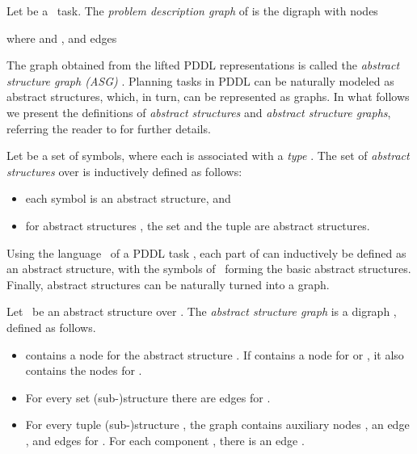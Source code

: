 \documentclass{article}
\begin{document}
\begin{definition}
    Let  be a \sasp\ task.
    The \emph{problem description graph} of  is the digraph
     with nodes
    
    where  and ,
    and edges
    
    
  \end{definition}
  
The graph obtained from the lifted PDDL representations is called the
\emph{abstract structure graph (ASG)} \cite{sievers-et-al-icaps2019}. Planning
tasks in PDDL can be naturally modeled as abstract structures, which, in turn,
can be represented as graphs. In what follows we present the definitions of
\emph{abstract structures} and \emph{abstract structure graphs}, referring the
reader to \citet{sievers-et-al-icaps2019} for further details.

\begin{definition}
  Let  be a set of symbols, where each  is associated with a
  \emph{type} . The set of \emph{abstract structures} over  is
  inductively defined as follows:
\begin{itemize}
    \item each symbol  is an abstract structure, and

    \item for abstract structures , the set  and the tuple 
    are abstract structures.
  \end{itemize}
\end{definition}

Using the language \lang\ of a PDDL task , each part of  can
inductively be defined as an abstract structure, with the symbols of \lang\
forming the basic abstract structures. Finally, abstract structures can be
naturally turned into a graph.

\begin{definition}
  Let \as\ be an abstract structure over . The \emph{abstract structure
  graph}  is a digraph ,
  defined as follows.
  \begin{itemize}
    \item  contains a node  for the abstract structure . If
     contains a node for  or , it also contains the nodes for .

    \item For every set (sub-)structure  there are edges
     for .

    \item For every tuple (sub-)structure ,
    the graph contains auxiliary nodes , an edge , and edges  for . For each component , there is an edge .
  \end{itemize}
\end{definition}
\end{document}
